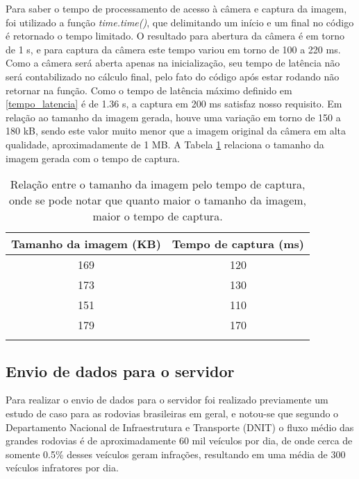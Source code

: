 Para saber o tempo de processamento de acesso à câmera e captura da imagem, foi utilizado a função \emph{time.time()}, que delimitando um início e um final no código é retornado o tempo limitado. O resultado para abertura da câmera é em torno de 1 s, e para captura da câmera este tempo variou em torno de 100 a 220 ms. Como a câmera será aberta apenas na inicialização, seu tempo de latência não será contabilizado no cálculo final, pelo fato do código após estar rodando não retornar na função. Como o tempo de latência máximo definido em \ref{tempo_latencia} é de 1.36 s, a captura em 200 ms satisfaz nosso requisito. Em relação ao tamanho da imagem gerada, houve uma variação em torno de 150 a 180 kB, sendo este valor muito menor que a imagem original da câmera em alta qualidade, aproximadamente de 1 MB.
A Tabela \ref{tabcap} relaciona o tamanho da imagem gerada com o tempo de captura.

\begin{table}[H]
\centering
\caption{Relação entre o tamanho da imagem pelo tempo de captura, onde se pode notar que quanto maior o tamanho da imagem, maior o tempo de captura.}
\label{undefined}
\begin{tabular}{|c|c|}
\hline
Tamanho da imagem (KB) & Tempo de captura (ms) \\ \hline
169                    & 120                   \\ \hline
173                    & 130                   \\ \hline
151                    & 110                   \\ \hline
179                    & 170                   \\ \hline
\label{tabcap}
\end{tabular}
\end{table}

    \subsection{Envio de dados para o servidor}
    
Para realizar o envio de dados para o servidor foi realizado previamente um estudo de caso para as rodovias brasileiras em geral, e notou-se que segundo o Departamento Nacional de Infraestrutura e Transporte (DNIT) \cite{DNIT} o fluxo médio das grandes rodovias é de aproximadamente 60 mil veículos por dia, de onde cerca de somente 0.5\% desses veículos geram infrações, resultando em uma média de 300 veículos infratores por dia.

